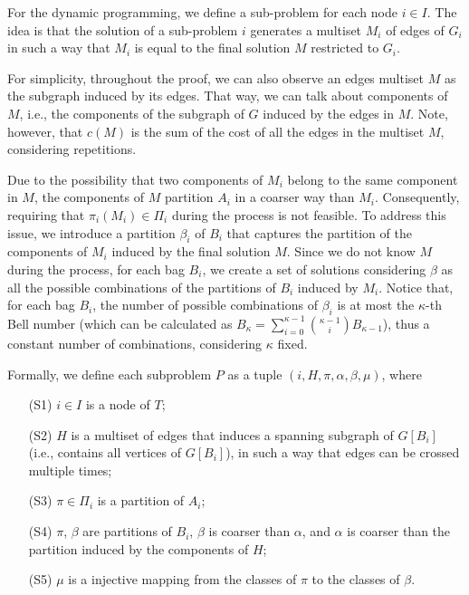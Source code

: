 For the dynamic programming, we define a sub-problem for each node \(i \in I\). The idea is that the solution of a sub-problem \(i\) generates a multiset \(M_i\) of edges of \(G_i\) in such a way that \(M_i\) is equal to the final solution \(M\) restricted to \(G_i\).

For simplicity, throughout the proof, we can also observe an edges multiset \(M\) as the subgraph induced by its edges. That way, we can talk about components of \(M\), i.e., the components of the subgraph of $G$ induced by the edges in \(M\). Note, however, that \(c(M)\) is the sum of the cost of all the edges in the multiset \(M\), considering repetitions.

Due to the possibility that two components of \(M_i\) belong to the same component in \(M\), the components of \(M\) partition \(A_i\) in a coarser way than \(M_i\). Consequently, requiring that \(\pi_i(M_i) \in \Pi_i\) during the process is not feasible. To address this issue, we introduce a partition \(\beta_i\) of \(B_i\) that captures the partition of the components of \(M_i\) induced by the final solution \(M\). Since we do not know \(M\) during the process, for each bag \(B_i\), we create a set of solutions considering \(\beta\) as all the possible combinations of the partitions of \(B_i\) induced by \(M_i\). Notice that, for each bag \(B_i\), the number of possible combinations of \(\beta_i\) is at most the \(\kappa\)-th Bell number (which can be calculated as \(B_{\kappa} = \sum_{i=0}^{\kappa - 1} \binom{\kappa - 1}{i} B_{\kappa - 1}\)), thus a constant number of combinations, considering \(\kappa\) fixed.

Formally, we define each subproblem \(P\) as a tuple \((i, H, \pi, \alpha, \beta, \mu)\), where 

\begin{itemize}
    \item[(S1)] \(i \in I\) is a node of \(T\);
    \item[(S2)] \(H\) is a multiset of edges that induces a spanning subgraph of \(G[B_i]\) (i.e., contains all vertices of \(G[B_i]\)), in such a way that edges can be crossed multiple times;
    \item[(S3)] \(\pi \in \Pi_i\) is a partition of \(A_i\);
    \item[(S4)] \(\pi\), \(\beta\) are partitions of \(B_i\), \(\beta\) is coarser than \(\alpha\), and \(\alpha\) is coarser than the partition induced by the components of \(H\);
    \item[(S5)] \(\mu\) is a injective mapping from the classes of \(\pi\) to the classes of \(\beta\).
\end{itemize}

